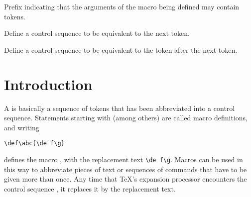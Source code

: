 \begin{inventory}
\item [\cs{long}] 
      Prefix indicating that the arguments of the macro being defined
      may contain  tokens.

\item [\cs{let}] 
      Define a control sequence to be equivalent to the next token.

\item [\cs{futurelet}] 
      Define a control sequence to be equivalent to
      the token after the next token.

\end{inventory}

\section{Introduction}

A 
is basically a sequence of tokens that has
been abbreviated into a control sequence.
Statements starting with (among others) 
are called {\italic macro definitions}\alt, and
writing
\begin{verbatim}
\def\abc{\de f\g}
\end{verbatim}
defines the macro ,
with the {\italic replacement text\/} \verb>\de f\g>.
Macros can be used in this way to abbreviate
pieces of text or sequences of commands
that have to be given more than once.
Any time that \TeX's expansion processor
encounters the control sequence ,
it replaces it by the replacement text.

